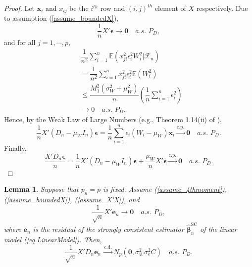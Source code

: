 \documentclass[ejs,authoryear,linksfromyear]{imsart}
\newcommand{\sumin}{\sum_{i=1}^n} %
\newcommand{\CONV}[1]{\stackrel{\text{#1}}{\longrightarrow}} %
\newcommand{\bSC}{\widehat{\bm{\beta}}_n^{\text{SC}}} %
\numberwithin{equation}{section}
\theoremstyle{plain}
\newtheorem{lem}{Lemma}[section]
\begin{document}
\begin{proof}
	Let $\bm{x}_i$ and $x_{ij}$ be the $i^{th}$ row and $(i,j)^{th}$ element of $X$ respectively. Due to assumption (\ref{assume_boundedX}),
	$$
	\dfrac{1}{n} X' \bm{\epsilon} \to \bm{0} 
	\quad a.s. \,\, P_D,
	$$
	and for all $j = 1, \cdots, p$,
	\begin{align*}
	&\dfrac{1}{n^2} \sumin \mathbb{E}
	\left( x^2_{ji} \epsilon_i^2 W_i^2 \Big| \mathcal{F}_n \right) \\
	&= \dfrac{1}{n^2} \sumin x^2_{ji} \epsilon_i^2 \mathbb{E} (W_i^2) \\
	&\leq \dfrac{M_1^2 ( \sigma^2_W + \mu_W^2 ) }{n} \left(
	\dfrac{1}{n} \sumin \epsilon_i^2
	\right) \\
	&\to 0 \quad a.s. \,\, P_D.
	\end{align*}
	Hence, by the Weak Law of Large Numbers (e.g., Theorem 1.14(ii) of \citet{junshao}),
	$$
	\dfrac{1}{n} X' (D_n - \mu_W I_n) \bm{\epsilon}
	= \dfrac{1}{n} \sumin \epsilon_i (W_i  - \mu_W) \bm{x}_i 
	\CONV{c.p.} \bm{0} \quad a.s. \,\, P_D.
	$$
	Finally, 
	$$
	\dfrac{X' D_n \bm{\epsilon}}{n} 
	= \dfrac{1}{n} X' (D_n - \mu_W I_n) \bm{\epsilon} 
	+ \dfrac{\mu_W}{n} X' \bm{\epsilon}
	\CONV{c.p.} \bm{0} \quad a.s. \,\, P_D.  
	$$
\end{proof}

\begin{lem} \label{lem_X'DnResid}
	Suppose that $p_n = p$ is fixed. Assume (\ref{assume_4thmoment}), (\ref{assume_boundedX}), (\ref{assume_X'X}), and
	$$
	\dfrac{1}{\sqrt{n}} X' \bm{e}_n \to \bm{0} 
	\quad a.s. \,\, P_D,
	$$
	where $\bm{e}_n$ is the residual of the strongly consistent estimator $\bSC$ of the linear model (\ref{eq.LinearModel}). Then,
	$$
	\dfrac{1}{\sqrt{n}} X' D_n \bm{e}_n \,
	\CONV{c.d.} N_p \left( \bm{0}, \sigma^2_W \sigma^2_\epsilon C \right)
	\quad a.s. \,\, P_D.
	$$ 
\end{lem}
\end{document}
